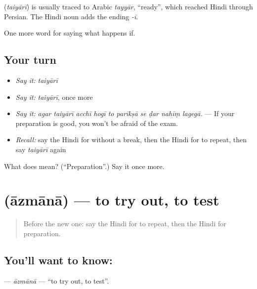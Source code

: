 \begin{cousinweb}
\textbf{} (\emph{taiyārī}) is usually traced to Arabic \emph{tayyār}, \textquotedblleft{}ready\textquotedblright{}, which reached Hindi through Persian. The Hindi noun adds the ending \emph{-ī}.
\end{cousinweb}

\begin{grammarlens}[title={What you've built}]
One more word for saying what happens if.
\end{grammarlens}

\subsection*{Your turn}
\begin{itemize}
\raggedright
  \item \emph{Say it:} \emph{taiyārī}
  \item \emph{Say it:} \emph{taiyārī}, once more
  \item \emph{Say it:} \emph{agar taiyārī acchī hogī to parīkṣā se ḍar nahīṃ lagegā.} — If your preparation is good, you won't be afraid of the exam.
  \item \emph{Recall:} say the Hindi for without a break, then the Hindi for to repeat, then say \emph{taiyārī} again
\end{itemize}

\begin{tcolorbox}[breakable,colback=teal!4,colframe=teal!35!black,title={Before you move on}]
What does  mean? (\textquotedblleft{}Preparation\textquotedblright{}.) Say it once more.
\end{tcolorbox}
\section[\texorpdfstring{\hi{आज़माना} (āzmānā)}{आज़माना (āzmānā)}]{ (āzmānā) — to try out, to test}

\label{lesson:HI-C392-azmana}



\begin{quote}
Before the new one: say the Hindi for to repeat, then the Hindi for preparation.
\end{quote}

\subsection*{You'll want to know: }
\textbf{} — \emph{āzmānā} — \textquotedblleft{}to try out, to test\textquotedblright{}.

